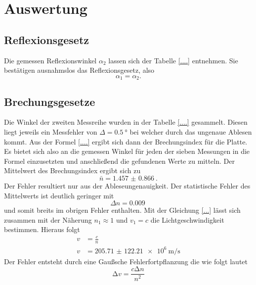 \section{Auswertung}

\subsection{Reflexionsgesetz}
Die gemessen Reflexionswinkel $\alpha_2$ lassen sich der Tabelle \ref{....} entnehmen. Sie bestätigen ausnahmslos
das Reflexionsgesetz, also %
\begin{equation*}
    \alpha_1=\alpha_2.
\end{equation*}


\subsection{Brechungsgesetze}
\label{brechung}
Die Winkel der zweiten Messreihe wurden in der Tabelle \ref{....} gesammelt. Diesen liegt jeweils ein Messfehler von
$\Delta = \SI{0.5}{\degree}$ bei welcher durch das ungenaue Ablesen kommt. Aus der Formel \eqref{....} ergibt sich dann 
der Brechungsindex für die Platte. Es bietet sich also an die gemessen Winkel für jeden der sieben Messungen in die Formel einzusetzten 
und anschließend die gefundenen Werte zu mitteln. Der Mittelwert des Brechungsindex ergibt sich zu
\begin{equation}
    \bar{n} = \SI{1.457(0866)}{}.
\end{equation}
Der Fehler resultiert nur aus der Ableseungenauigkeit. Der statistische Fehler des Mittelwerts ist deutlich geringer mit
\begin{equation*}
    \Delta n = \SI{0.009}{}
\end{equation*}
und somit breits im obrigen Fehler enthalten. Mit der Gleichung \eqref{...} lässt sich zusammen mit der Näherung $n_1 \approx 1$
und $v_1 = c$ \cite{...} die Lichtgeschwindigkeit bestimmen. Hieraus folgt
\begin{align*}
    v &= \frac{c}{n} \\
    v &= \SI{205.71(12221)e6}{\meter\per\second}
\end{align*}
Der Fehler entsteht durch eine Gaußsche Fehlerfortpflanzung die wie folgt lautet
\begin{equation}
    \increment v = \frac{c \increment n}{n^2}
\end{equation}


